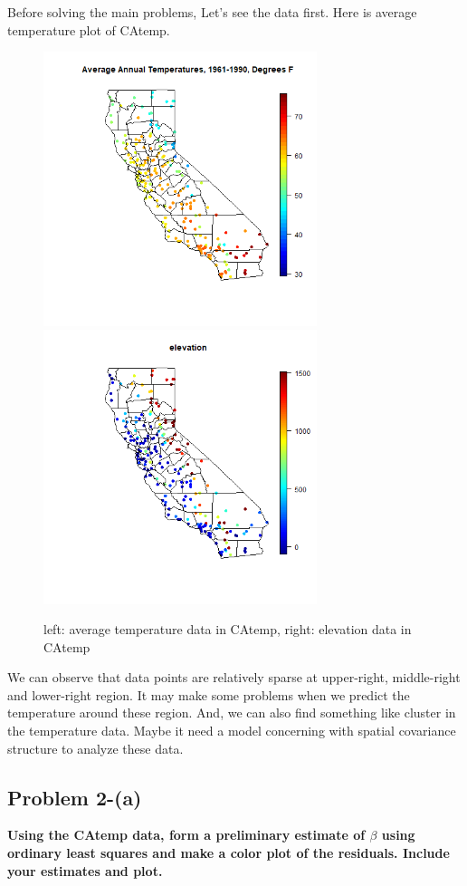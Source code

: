 \documentclass{article}
\begin{document}
Before solving the main problems, Let's see the data first. Here is average temperature plot of CAtemp.
\begin{figure}[!h]
    \centering
    \includegraphics[height=8cm]{prob2_CAtemp_avgtemp.png}
    \includegraphics[height=8cm]{prob2_CAtemp_elevation.png}
    \caption{left: average temperature data in CAtemp, right: elevation data in CAtemp}
\end{figure}

We can observe that data points are relatively sparse at upper-right, middle-right and lower-right region.
It may make some problems when we predict the temperature around these region.
And, we can also find something like cluster in the temperature data.
Maybe it need a model concerning with spatial covariance structure to analyze these data.


\clearpage
\subsection{Problem 2-(a)}
\textbf{
Using the CAtemp data, form a preliminary estimate of $\beta$ using ordinary least squares 
and make a color plot of the residuals.
Include your estimates and plot.
}
\end{document}
